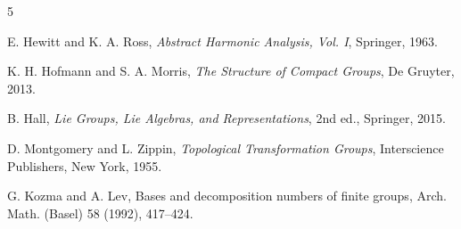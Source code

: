 \documentclass[12pt]{amsart}
\begin{document}
\begin{thebibliography}{5}

E. Hewitt and K. A. Ross,
\textit{Abstract Harmonic Analysis, Vol. I},
Springer, 1963.

K. H. Hofmann and S. A. Morris,
\textit{The Structure of Compact Groups},
De Gruyter, 2013.

B. Hall,
\textit{Lie Groups, Lie Algebras, and Representations},
2nd ed., Springer, 2015.

D. Montgomery and L. Zippin,
\textit{Topological Transformation Groups},
Interscience Publishers, New York, 1955.

G. Kozma and A. Lev,
Bases and decomposition numbers of finite groups,
Arch. Math. (Basel) 58 (1992), 417--424.

\end{thebibliography}
\end{document}
